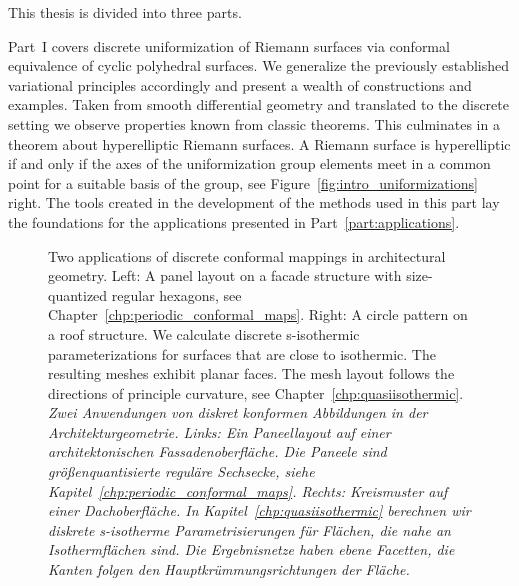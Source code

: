 \documentclass[Thesis.tex]{subfiles}
\begin{document}
This thesis is divided into three parts. 

Part~I covers discrete uniformization of Riemann surfaces via conformal equivalence of cyclic polyhedral surfaces.
We generalize the previously established variational principles accordingly and present a wealth of constructions and examples. 
Taken from smooth differential geometry and translated to the discrete setting we observe properties known from classic theorems. 
This culminates in a theorem about hyperelliptic Riemann surfaces.
A Riemann surface is hyperelliptic if and only if the axes of the uniformization group elements meet in a common point for a suitable basis of the group, see Figure~\ref{fig:intro_uniformizations} right.
The tools created in the development of the methods used in this part lay the foundations for the applications presented in Part~\ref{part:applications}.

\begin{figure}
\centering
{}
\caption{
Two applications of discrete conformal mappings in architectural geometry. 
Left: A panel layout on a facade structure with size-quantized regular hexagons, see Chapter~\ref{chp:periodic_conformal_maps}.
Right: A circle pattern on a roof structure. 
We calculate discrete s-isothermic parameterizations for surfaces that are close to isothermic.
The resulting meshes exhibit planar faces. 
The mesh layout follows the directions of principle curvature, see Chapter~\ref{chp:quasiisothermic}.\\
\it Zwei Anwendungen von diskret konformen Abbildungen in der Architekturgeometrie. 
Links: Ein Paneellayout auf einer architektonischen Fassadenoberfl\"{a}che. 
Die Paneele sind gr\"{o}{\ss}enquantisierte regul\"{a}re Sechsecke, siehe Kapitel~\ref{chp:periodic_conformal_maps}.
Rechts: Kreismuster auf einer Dachoberfl\"{a}che.
In Kapitel~\ref{chp:quasiisothermic} berechnen wir diskrete s-isotherme Parametrisierungen f\"{u}r Fl\"{a}chen, die nahe an Isothermfl\"{a}chen sind.
Die Ergebnisnetze haben ebene Facetten, die Kanten folgen den Hauptkr\"{u}mmungsrichtungen der Fl\"{a}che. 
}
\label{fig:intro_applications} 
\end{figure}
\end{document}
